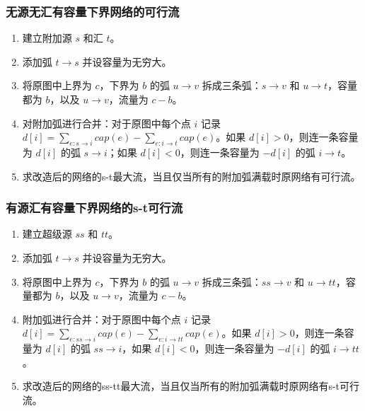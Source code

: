 \subsubsection{无源无汇有容量下界网络的可行流}

\begin{enumerate}

\item 建立附加源 $s$ 和汇 $t$。

\item 添加弧 $t\to s$ 并设容量为无穷大。

\item 将原图中上界为 $c$，下界为 $b$ 的弧 $u\to v$ 拆成三条弧：$s\to v$ 和 $u \to t$，容量都为 $b$，以及 $u\to v$，流量为 $c-b$。

\item 对附加弧进行合并：对于原图中每个点 $i$ 记录 $d[i]=\sum\limits_{e:s\to i} cap(e) - \sum\limits_{e:i\to t} cap(e)$。如果 $d[i]>0$，则连一条容量为 $d[i]$ 的弧 $s\to i$；如果 $d[i]<0$，则连一条容量为 $-d[i]$ 的弧 $i\to t$。

\item 求改造后的网络的s-t最大流，当且仅当所有的附加弧满载时原网络有可行流。

\end{enumerate}

\subsubsection{有源汇有容量下界网络的s-t可行流}

\begin{enumerate}

\item 建立超级源 $ss$ 和 $tt$。

\item 添加弧 $t\to s$ 并设容量为无穷大。

\item 将原图中上界为 $c$，下界为 $b$ 的弧 $u\to v$ 拆成三条弧：$ss\to v$ 和 $u \to tt$，容量都为 $b$，以及 $u\to v$，流量为 $c-b$。

\item 附加弧进行合并：对于原图中每个点 $i$ 记录 $d[i]=\sum\limits_{e:ss\to i} cap(e) - \sum\limits_{e:i\to tt} cap(e)$。如果 $d[i]>0$，则连一条容量为 $d[i]$ 的弧 $ss\to i$，如果 $d[i]<0$，则连一条容量为 $-d[i]$ 的弧 $i\to tt$。

\item 求改造后的网络的ss-tt最大流，当且仅当所有的附加弧满载时原网络有s-t可行流。

\end{enumerate}


